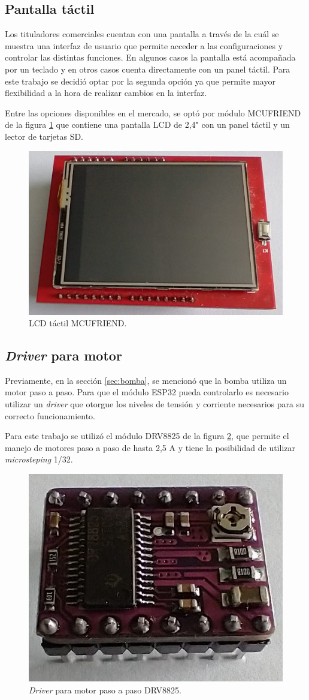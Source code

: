 \subsection{Pantalla táctil}

Los tituladores comerciales cuentan con una pantalla a través de la cuál se muestra una interfaz de usuario que permite acceder a las configuraciones y controlar las distintas funciones. En algunos casos la pantalla está acompañada por un teclado y en otros casos cuenta directamente con un panel táctil. Para este trabajo se decidió optar por la segunda opción ya que permite mayor flexibilidad a la hora de realizar cambios en la interfaz.

Entre las opciones disponibles en el mercado, se optó por módulo MCUFRIEND de la figura \ref{fig:LCDFrente} que contiene una pantalla LCD de 2,4" con un panel táctil y un lector de tarjetas SD.

\begin{figure}[htbp]
	\centering
	\includegraphics[width=.4\textwidth]{./Figures/LCDFrente.jpeg}
	\caption{LCD táctil MCUFRIEND.}
	\label{fig:LCDFrente}
\end{figure}

\subsection{\textit{Driver} para motor}

Previamente, en la sección \ref{sec:bomba}, se mencionó que la bomba utiliza un motor paso a paso. Para que el módulo ESP32 pueda controlarlo es necesario utilizar un \textit{driver} que otorgue los niveles de tensión y corriente necesarios para su correcto funcionamiento.

Para este trabajo se utilizó el módulo DRV8825 de la figura \ref{fig:DRV8825-Frente}, que permite el manejo de motores paso a paso de hasta 2,5 A y tiene la posibilidad de utilizar \textit{microsteping} 1/32.

\begin{figure}[htbp]
	\centering
	\includegraphics[width=.3\textwidth]{./Figures/DRV8825-Frente.jpeg}
	\caption{\textit{Driver} para motor paso a paso DRV8825.}
	\label{fig:DRV8825-Frente}
\end{figure}


